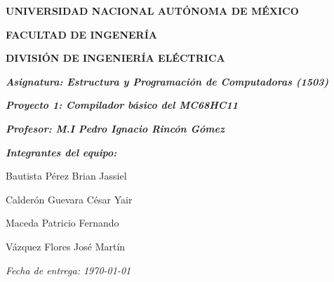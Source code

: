 \documentclass[letterpaper]{report}
\begin{document}
    \begin{figure}
        \hfill
    \end{figure}

    \begin{titlepage}
        \centering
        {\bfseries\LARGE UNIVERSIDAD NACIONAL AUT\'ONOMA DE M\'EXICO \par}
        \vspace{1cm}
        {\bfseries\LARGE FACULTAD DE INGENER\'IA \par}
        \vspace{1cm}
        {\bfseries\LARGE DIVISI\'ON DE INGENIER\'IA EL\'ECTRICA \par}
        \vspace{1cm}
        {\itshape\Large\textbf{Asignatura: Estructura y Programaci\'on de 
        Computadoras (1503)}}
        \vspace{1cm}
        {\itshape\Large\textbf{Proyecto 1: Compilador básico del MC68HC11}\par}
        \vspace{1cm}
        {\itshape\Large \textbf{Profesor: M.I Pedro Ignacio Rinc\'on G\'omez\\}
        \par}
        \vspace{1cm}
        \vfill
        {\itshape\Large \textbf{Integrantes del equipo:} \\\par}
        \begin{itemize}
            \centering
            {\itshape\Large
            \item [\textbullet] Bautista P\'erez Brian Jassiel
            \item [\textbullet] Calder\'on Guevara C\'esar Yair
            \item [\textbullet] Maceda Patricio Fernando
            \item [\textbullet] V\'azquez Flores Jos\'e Mart\'in}
        \end{itemize}
        \vfill
        \vspace{1cm}
        {\itshape\Large Fecha de entrega: \today\par}
    \end{titlepage}
    
\end{document}
